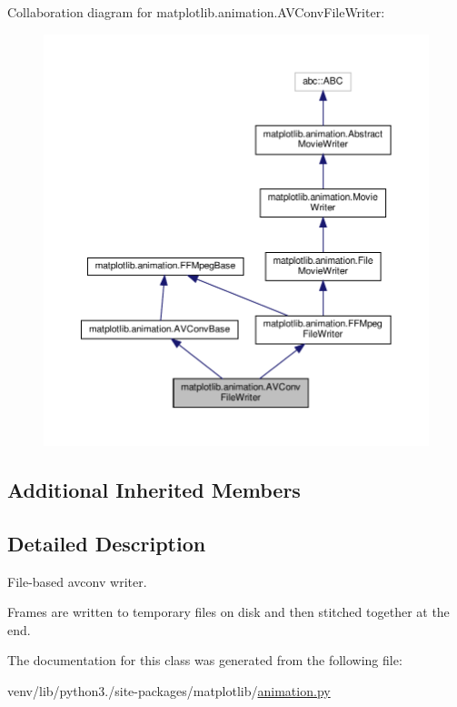Collaboration diagram for matplotlib.\+animation.\+A\+V\+Conv\+File\+Writer\+:
\nopagebreak
\begin{figure}[H]
\begin{center}
\leavevmode
\includegraphics[width=350pt]{classmatplotlib_1_1animation_1_1AVConvFileWriter__coll__graph}
\end{center}
\end{figure}
\subsection*{Additional Inherited Members}


\subsection{Detailed Description}
\begin{DoxyVerb}File-based avconv writer.

Frames are written to temporary files on disk and then stitched
together at the end.
\end{DoxyVerb}
 

The documentation for this class was generated from the following file\+:\begin{DoxyCompactItemize}
\item 
venv/lib/python3./site-\/packages/matplotlib/\hyperlink{animation_8py}{animation.\+py}\end{DoxyCompactItemize}
